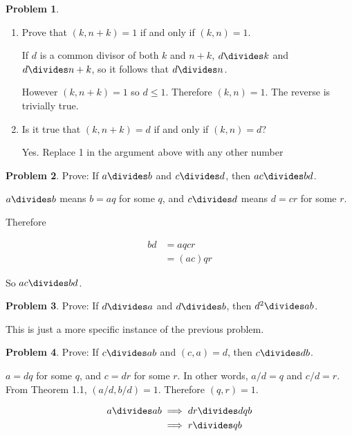 \documentclass{article}
\theoremstyle{definition}
\newtheorem{problem}{Problem}
\begin{document}
  \begin{problem}
    ~
  \end{problem}
  
  \begin{enumerate}[label=\alph*)]
    \item Prove that $(k, n + k) = 1$ if and only if $(k, n) = 1$.
    
    If $d$ is a common divisor of both $k$ and $n + k$, $d \divides k$ and $d \divides n + k$, so it follows that $d \divides n$.
    
    However $(k, n + k) = 1$ so $d \leq 1$. Therefore $(k, n) = 1$. The reverse is trivially true.
    
    \item Is it true that $(k, n + k) = d$ if and only if $(k, n) = d$?
    
    Yes. Replace 1 in the argument above with any other number
  \end{enumerate}
  
  \begin{problem}
    Prove: If $a \divides b$ and $c \divides d$, then $ac \divides bd$.
  \end{problem}
  
  $a \divides b$ means $b = aq$ for some $q$, and $c \divides d$ means $d = cr$ for some $r$.
  
  Therefore
  
  \begin{align*}
    bd &= aqcr \\
    &= (ac)qr
  \end{align*}
  
  So $ac \divides bd$.
  
  \begin{problem}
    Prove: If $d \divides a$ and $d \divides b$, then $d^2 \divides ab$.
  \end{problem}
  
  This is just a more specific instance of the previous problem.
  
  \begin{problem}
    Prove: If $c \divides ab$ and $(c, a) = d$, then $c \divides db$.
  \end{problem}
  
  $a = dq$ for some $q$, and $c = dr$ for some $r$. In other words,
  $a/d = q$ and $c/d = r$. From Theorem 1.1, $(a/d, b/d) = 1$. Therefore
  $(q, r) = 1$.
  
  \begin{align*}
    a \divides ab &\implies dr \divides dqb \\
    &\implies r \divides qb
  \end{align*}
  
\end{document}
